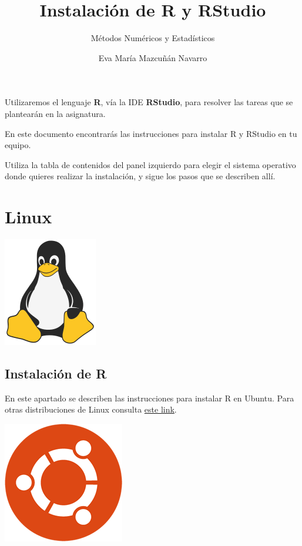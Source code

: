 \documentclass[spanish,]{article}
\title{Instalación de R y RStudio}
\subtitle{Métodos Numéricos y Estadísticos}
\author{Eva María Mazcuñán Navarro}
\date{}
\begin{document}
\maketitle


{
\setcounter{tocdepth}{2}
\tableofcontents
}
\hypertarget{section}{%
\section*{}\label{section}}

Utilizaremos el lenguaje \textbf{R}, vía la IDE \textbf{RStudio}, para resolver las tareas que se plantearán en la asignatura.

En este documento encontrarás las instrucciones para instalar R y RStudio en tu equipo.

Utiliza la tabla de contenidos del panel izquierdo para elegir el sistema operativo donde quieres realizar la instalación, y sigue los pasos que se describen allí.

\hypertarget{linux}{%
\section{Linux}\label{linux}}

\begin{center}\includegraphics[width=0.15\linewidth]{images/os/tux-flat} \end{center}

\hypertarget{instalaciuxf3n-de-r}{%
\subsection{Instalación de R}\label{instalaciuxf3n-de-r}}

En este apartado se describen las instrucciones para instalar R en Ubuntu. Para otras distribuciones de Linux consulta \href{https://ftp.cixug.es/CRAN/bin/linux/}{este link}.

\begin{center}\includegraphics[width=0.15\linewidth]{images/os/ubuntu} \end{center}
\end{document}
